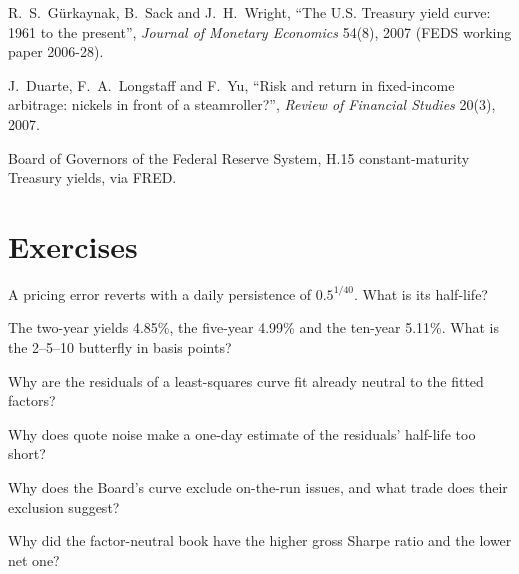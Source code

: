 \begin{omsources}
\item R.~S.~Gürkaynak, B.~Sack and J.~H.~Wright, ``The U.S. Treasury yield curve: 1961 to the present'', \emph{Journal of Monetary Economics}
54(8), 2007 (FEDS working paper 2006-28).
\item J.~Duarte, F.~A.~Longstaff and F.~Yu, ``Risk and return in fixed-income arbitrage: nickels in front of a steamroller?'', \emph{Review of
Financial Studies} 20(3), 2007.
\item Board of Governors of the Federal Reserve System, H.15 constant-maturity Treasury yields, via FRED.
\end{omsources}

\section{Exercises}

\begin{exercise}[$\star$]\label{exo:s2:government-bond-relative-value:1}
A pricing error reverts with a daily persistence of $0.5^{1/40}$. What is its half-life?
\end{exercise}

\begin{exercise}[$\star$]\label{exo:s2:government-bond-relative-value:2}
The two-year yields 4.85\%, the five-year 4.99\% and the ten-year 5.11\%. What is the 2--5--10 butterfly in basis points?
\end{exercise}

\begin{exercise}[$\star$]\label{exo:s2:government-bond-relative-value:3}
Why are the residuals of a least-squares curve fit already neutral to the fitted factors?
\end{exercise}

\begin{exercise}[$\star\star$]\label{exo:s2:government-bond-relative-value:4}
Why does quote noise make a one-day estimate of the residuals' half-life too short?
\end{exercise}

\begin{exercise}[$\star\star$]\label{exo:s2:government-bond-relative-value:5}
Why does the Board's curve exclude on-the-run issues, and what trade does their exclusion suggest?
\end{exercise}

\begin{exercise}[$\star\star$]\label{exo:s2:government-bond-relative-value:6}
Why did the factor-neutral book have the higher gross Sharpe ratio and the lower net one?
\end{exercise}

